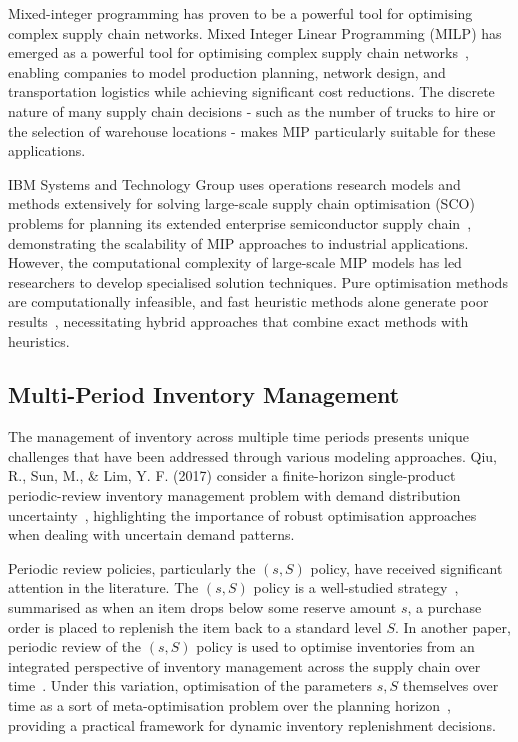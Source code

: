 \documentclass[a4paper,12pt]{article}
\begin{document}
Mixed-integer programming has proven to be a powerful tool for optimising complex supply chain networks.
Mixed Integer Linear Programming (MILP) has emerged as a powerful tool for optimising complex supply chain networks~\cite{researchgate2024optimizing}, enabling companies to model production planning, network design, and transportation logistics while achieving significant cost reductions.
The discrete nature of many supply chain decisions - such as the number of trucks to hire or the selection of warehouse locations - makes MIP particularly suitable for these applications.

IBM Systems and Technology Group uses operations research models and methods extensively for solving large-scale supply chain optimisation (SCO) problems for planning its extended enterprise semiconductor supply chain~\cite{denton2005methods}, demonstrating the scalability of MIP approaches to industrial applications.
However, the computational complexity of large-scale MIP models has led researchers to develop specialised solution techniques.
Pure optimisation methods are computationally infeasible, and fast heuristic methods alone generate poor results~\cite{denton2005methods}, necessitating hybrid approaches that combine exact methods with heuristics.

\subsection{Multi-Period Inventory Management}\label{subsec:multi-period-inventory-management}

The management of inventory across multiple time periods presents unique challenges that have been addressed through various modeling approaches.
Qiu, R., Sun, M., \& Lim, Y. F. (2017) consider a finite-horizon single-product periodic-review inventory management problem with demand distribution uncertainty~\cite{qiu2017optimizing}, highlighting the importance of robust optimisation approaches when dealing with uncertain demand patterns.

Periodic review policies, particularly the $(s,S)$ policy, have received significant attention in the literature.
The $(s, S)$ policy is a well-studied strategy~\cite{zheng1991}, summarised as when an item drops below some reserve amount $s$, a purchase order is placed to replenish the item back to a standard level $S$.
In another paper, periodic review of the $(s,S)$ policy is used to optimise inventories from an integrated perspective of inventory management across the supply chain over time~\cite{mdpi2025inventory}.
Under this variation, optimisation of the parameters $s, S$ themselves over time as a sort of meta-optimisation problem over the planning horizon~\cite{mdpi2025inventory}, providing a practical framework for dynamic inventory replenishment decisions.
\end{document}
